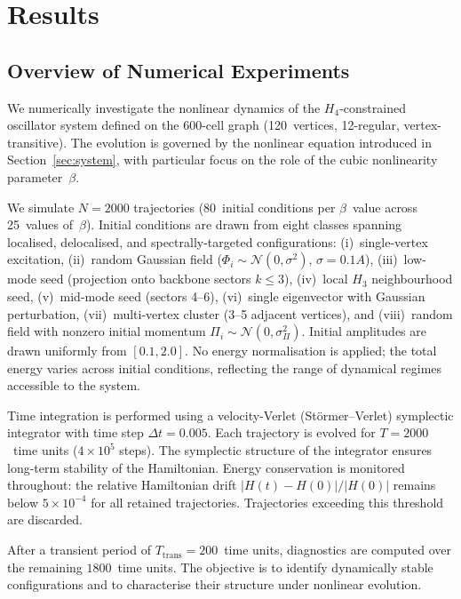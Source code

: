 \documentclass[12pt,a4paper]{article}
\newcommand{\Hfour}{H_4}
\newcommand{\Hthree}{H_3}
\begin{document}
\section{Results}\label{sec:numerics}

\subsection{Overview of Numerical Experiments}\label{sec:overview}

We numerically investigate the nonlinear dynamics of the
$\Hfour$-constrained oscillator system defined on the 600-cell graph
(120~vertices, 12-regular, vertex-transitive).  The evolution is
governed by the nonlinear equation introduced in
Section~\ref{sec:system}, with particular focus on the role of the
cubic nonlinearity parameter~$\beta$.

We simulate $N = 2000$ trajectories (80~initial conditions per
$\beta$~value across 25~values of~$\beta$).  Initial conditions are
drawn from eight classes spanning localised, delocalised, and
spectrally-targeted configurations: (i)~single-vertex excitation,
(ii)~random Gaussian field ($\Phi_i \sim \mathcal{N}(0, \sigma^2)$,
$\sigma = 0.1A$), (iii)~low-mode seed (projection onto backbone
sectors $k \leq 3$), (iv)~local $\Hthree$ neighbourhood seed,
(v)~mid-mode seed (sectors 4--6), (vi)~single eigenvector with
Gaussian perturbation, (vii)~multi-vertex cluster (3--5 adjacent
vertices), and (viii)~random field with nonzero initial momentum
$\Pi_i \sim \mathcal{N}(0, \sigma_\Pi^2)$.  Initial amplitudes are
drawn uniformly from $[0.1, 2.0]$.  No energy normalisation is
applied; the total energy varies across initial conditions, reflecting
the range of dynamical regimes accessible to the system.

Time integration is performed using a velocity-Verlet (St\"ormer--Verlet)
symplectic integrator with time step $\Delta t = 0.005$.  Each
trajectory is evolved for $T = 2000$~time units ($4 \times 10^5$
steps).  The symplectic structure of the integrator ensures long-term
stability of the Hamiltonian.  Energy conservation is monitored
throughout: the relative Hamiltonian drift
$|H(t) - H(0)|/|H(0)|$ remains below $5 \times 10^{-4}$ for all
retained trajectories.  Trajectories exceeding this threshold are
discarded.

After a transient period of $T_{\mathrm{trans}} = 200$~time units,
diagnostics are computed over the remaining $1800$~time units.  The
objective is to identify dynamically stable configurations and to
characterise their structure under nonlinear evolution.
\end{document}
